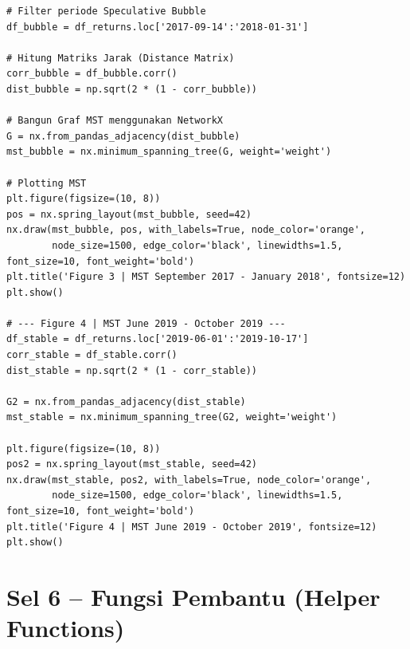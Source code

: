 \documentclass[12pt,a4paper]{article}
\begin{document}
\begin{lstlisting}[caption={Konstruksi dan Plot MST}]
# Filter periode Speculative Bubble
df_bubble = df_returns.loc['2017-09-14':'2018-01-31']

# Hitung Matriks Jarak (Distance Matrix)
corr_bubble = df_bubble.corr()
dist_bubble = np.sqrt(2 * (1 - corr_bubble))

# Bangun Graf MST menggunakan NetworkX
G = nx.from_pandas_adjacency(dist_bubble)
mst_bubble = nx.minimum_spanning_tree(G, weight='weight')

# Plotting MST
plt.figure(figsize=(10, 8))
pos = nx.spring_layout(mst_bubble, seed=42)
nx.draw(mst_bubble, pos, with_labels=True, node_color='orange',
        node_size=1500, edge_color='black', linewidths=1.5, font_size=10, font_weight='bold')
plt.title('Figure 3 | MST September 2017 - January 2018', fontsize=12)
plt.show()

# --- Figure 4 | MST June 2019 - October 2019 ---
df_stable = df_returns.loc['2019-06-01':'2019-10-17']
corr_stable = df_stable.corr()
dist_stable = np.sqrt(2 * (1 - corr_stable))

G2 = nx.from_pandas_adjacency(dist_stable)
mst_stable = nx.minimum_spanning_tree(G2, weight='weight')

plt.figure(figsize=(10, 8))
pos2 = nx.spring_layout(mst_stable, seed=42)
nx.draw(mst_stable, pos2, with_labels=True, node_color='orange',
        node_size=1500, edge_color='black', linewidths=1.5, font_size=10, font_weight='bold')
plt.title('Figure 4 | MST June 2019 - October 2019', fontsize=12)
plt.show()
\end{lstlisting}

\section{Sel 6 -- Fungsi Pembantu (Helper Functions)}
\end{document}
